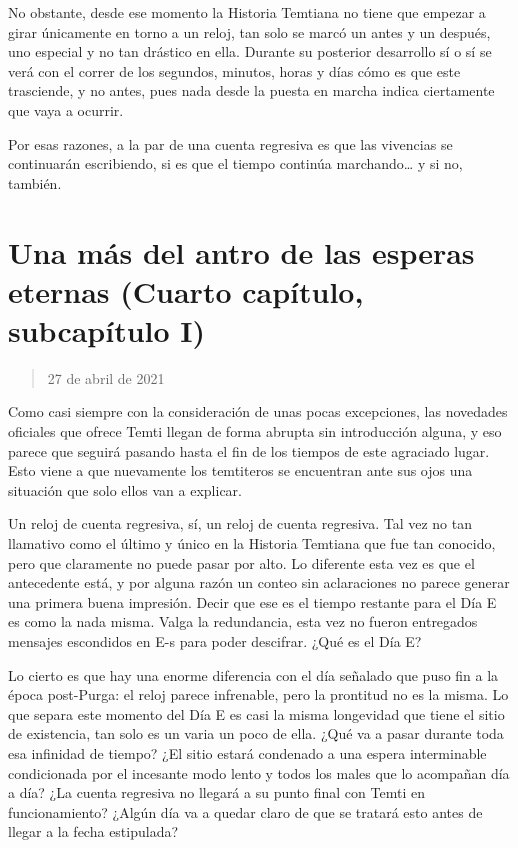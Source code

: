 \documentclass[
  spanish,
]{book}
\begin{document}
No obstante, desde ese momento la Historia Temtiana no tiene que empezar a girar únicamente en torno a un reloj, tan solo se marcó un antes y un después, uno especial y no tan drástico en ella. Durante su posterior desarrollo sí o sí se verá con el correr de los segundos, minutos, horas y días cómo es que este trasciende, y no antes, pues nada desde la puesta en marcha indica ciertamente que vaya a ocurrir.

Por esas razones, a la par de una cuenta regresiva es que las vivencias se continuarán escribiendo, si es que el tiempo continúa marchando\ldots{} y si no, también.

\hypertarget{una-muxe1s-del-antro-de-las-esperas-eternas-cuarto-capuxedtulo-subcapuxedtulo-i}{%
\section{Una más del antro de las esperas eternas (Cuarto capítulo, subcapítulo I)}\label{una-muxe1s-del-antro-de-las-esperas-eternas-cuarto-capuxedtulo-subcapuxedtulo-i}}

\begin{quote}
27 de abril de 2021
\end{quote}

Como casi siempre con la consideración de unas pocas excepciones, las novedades oficiales que ofrece Temti llegan de forma abrupta sin introducción alguna, y eso parece que seguirá pasando hasta el fin de los tiempos de este agraciado lugar. Esto viene a que nuevamente los temtiteros se encuentran ante sus ojos una situación que solo ellos van a explicar.

Un reloj de cuenta regresiva, sí, un reloj de cuenta regresiva. Tal vez no tan llamativo como el último y único en la Historia Temtiana que fue tan conocido, pero que claramente no puede pasar por alto. Lo diferente esta vez es que el antecedente está, y por alguna razón un conteo sin aclaraciones no parece generar una primera buena impresión. Decir que ese es el tiempo restante para el Día E es como la nada misma. Valga la redundancia, esta vez no fueron entregados mensajes escondidos en E-s para poder descifrar. ¿Qué es el Día E?

Lo cierto es que hay una enorme diferencia con el día señalado que puso fin a la época post-Purga: el reloj parece infrenable, pero la prontitud no es la misma. Lo que separa este momento del Día E es casi la misma longevidad que tiene el sitio de existencia, tan solo es un varia un poco de ella. ¿Qué va a pasar durante toda esa infinidad de tiempo? ¿El sitio estará condenado a una espera interminable condicionada por el incesante modo lento y todos los males que lo acompañan día a día? ¿La cuenta regresiva no llegará a su punto final con Temti en funcionamiento? ¿Algún día va a quedar claro de que se tratará esto antes de llegar a la fecha estipulada?
\end{document}
